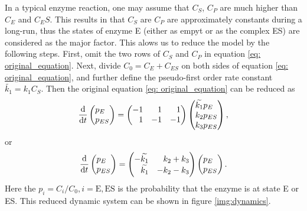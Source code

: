 	In a typical enzyme reaction, one may assume that $C_S$, $C_P$ are much higher than $C_E$ and $C_ES$. This results in that $C_S$ are $C_P$ are approximately constants during a long-run, thus the states of enzyme E (either as empyt or as the complex ES) are considered as the major factor. This alows us to reduce the model by the following steps. First, omit the two rows of $C_S$ and $C_P$ in equation \eqref{eq: original_equation}. Next, divide $C_0 = C_E + C_{ES}$ on both sides of equation \eqref{eq: original_equation}, and further define the pseudo-first order rate constant $\widetilde{k_1}=k_1C_S$. Then the original equation \eqref{eq: original_equation} can be reduced as
	\begin{equation}
	\dv{}{t}\begin{pmatrix*}[l] p_E \\ p_{ES} \end{pmatrix*} = 
		\begin{pmatrix*}[r]
			-1 &  1 &  1 \\
			 1 & -1 & -1 \\
		\end{pmatrix*}
		\begin{pmatrix*}[l] \widetilde{k_1}p_E \\ k_2p_{ES} \\ k_3p_{ES}\end{pmatrix*},
	\end{equation}
	or
	\begin{equation}
	\dv{}{t}\begin{pmatrix*}[l] p_E \\ p_{ES} \end{pmatrix*} = 
		\begin{pmatrix*}[r]
			-\widetilde{k_1} &  k_2+k_3 \\
			 \widetilde{k_1} & -k_2-k_3 \\
		\end{pmatrix*}
		\begin{pmatrix*}[l] p_E \\ p_{ES} \end{pmatrix*}.
	\label{eq: master_eq}
	\end{equation}
	Here the $p_i=C_i/C_0, i=\text{E}, \text{ES}$ is the probability that the enzyme is at state E or ES. This reduced dynamic system can be shown in figure \ref{img:dynamics}.
